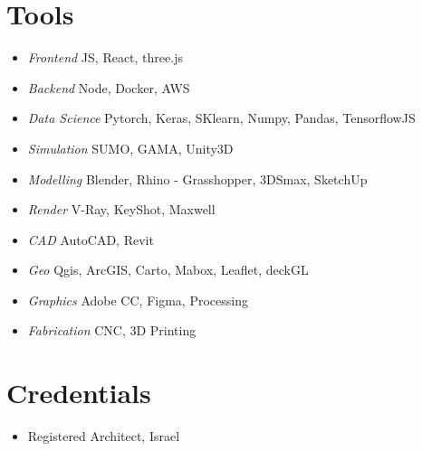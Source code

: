 \section*{Tools}
    
\begin{itemize}
    \item \textit{Frontend} \tab JS, React, three.js
    \item \textit{Backend} \tab Node, Docker, AWS 
    \item \textit{Data Science} \tab Pytorch, Keras, SKlearn, Numpy, Pandas, TensorflowJS 
    \item \textit{Simulation} \tab SUMO, GAMA, Unity3D
    \item \textit{Modelling} \tab Blender, Rhino - Grasshopper, 3DSmax, SketchUp 
    \item \textit{Render} \tab V-Ray, KeyShot, Maxwell
    \item \textit{CAD} \tab AutoCAD, Revit
    \item \textit{Geo} \tab Qgis, ArcGIS, Carto, Mabox, Leaflet, deckGL 
    \item \textit{Graphics} \tab Adobe CC, Figma, Processing
    \item \textit{Fabrication} \tab CNC, 3D Printing 
\end{itemize}

\section*{Credentials}

    \begin{itemize}
        \item Registered Architect, Israel 
    \end{itemize}



  















